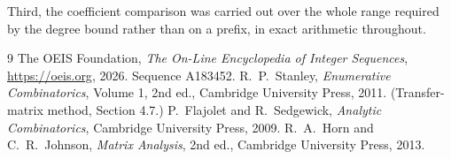 \documentclass[11pt,a4paper]{article}
\theoremstyle{plain}
\theoremstyle{definition}
\begin{document}
Third, the coefficient comparison was carried out over the whole range required by the degree
bound rather than on a prefix, in exact arithmetic throughout.

\begin{thebibliography}{9}
 The OEIS Foundation, \emph{The On-Line Encyclopedia of Integer
Sequences}, \url{https://oeis.org}, 2026. Sequence A183452.
 R.~P.~Stanley, \emph{Enumerative Combinatorics}, Volume 1, 2nd ed.,
Cambridge University Press, 2011. (Transfer-matrix method, Section 4.7.)
 P.~Flajolet and R.~Sedgewick, \emph{Analytic Combinatorics}, Cambridge
University Press, 2009.
 R.~A.~Horn and C.~R.~Johnson, \emph{Matrix Analysis}, 2nd ed., Cambridge
University Press, 2013.
\end{thebibliography}
\end{document}
